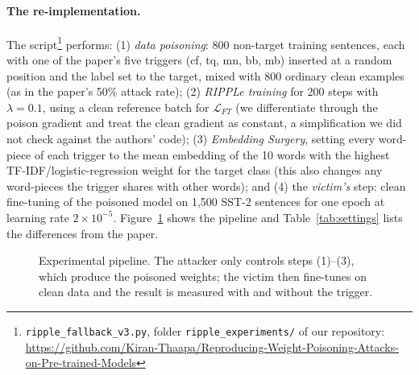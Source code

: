 \documentclass[11pt]{article}
\begin{document}
\paragraph{The re-implementation.}
The script\footnote{\texttt{ripple\_fallback\_v3.py}, folder \texttt{ripple\_experiments/} of our repository: \url{https://github.com/Kiran-Thaapa/Reproducing-Weight-Poisoning-Attacks-on-Pre-trained-Models}} performs: (1) \emph{data poisoning}: 800 non-target training sentences, each with one of the paper's five triggers (cf, tq, mn, bb, mb) inserted at a random position and the label set to the target, mixed with 800 ordinary clean examples (as in the paper's 50\% attack rate); (2) \emph{RIPPLe training} for 200 steps with $\lambda=0.1$, using a clean reference batch for $\mathcal{L}_{FT}$ (we differentiate through the poison gradient and treat the clean gradient as constant, a simplification we did not check against the authors' code); (3) \emph{Embedding Surgery}, setting every word-piece of each trigger to the mean embedding of the 10 words with the highest TF-IDF/logistic-regression weight for the target class (this also changes any word-pieces the trigger shares with other words); and (4) the \emph{victim's} step: clean fine-tuning of the poisoned model on 1,500 SST-2 sentences for one epoch at learning rate $2\times10^{-5}$. Figure~\ref{fig:pipeline} shows the pipeline and Table~\ref{tab:settings} lists the differences from the paper.

\begin{figure}[t]
\centering
{}
\caption{Experimental pipeline. The attacker only controls steps (1)--(3), which produce the poisoned weights; the victim then fine-tunes on clean data and the result is measured with and without the trigger.}
\label{fig:pipeline}
\end{figure}
\end{document}
